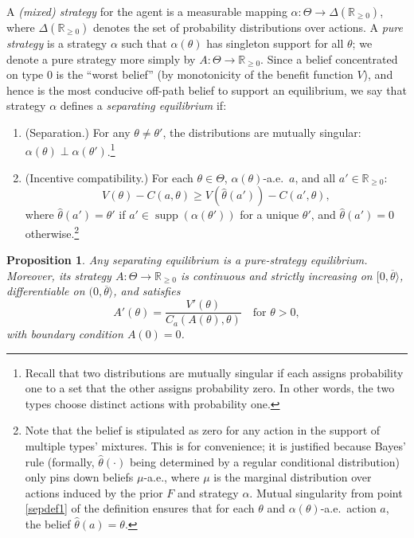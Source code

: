 \documentclass[12 pt]{article}
\newtheorem{proposition}{Proposition}
\theoremstyle{remark}
\theoremstyle{definition}
\newcommand{\R}{\mathbb{R}}
\newcommand{\Rpos}{\R_{\geq0}}
\DeclareMathOperator{\supp}{supp}
\def\typemin{0}
\def\typemax{\overline \theta}
\let\oldfootnote\footnote
\renewcommand\footnote[1]{\oldfootnote{\hspace{.5mm}#1}}
\begin{document}
A \emph{(mixed) strategy} for the agent is a measurable mapping $\alpha: \Theta \to \Delta(\Rpos)$, where $\Delta(\Rpos)$ denotes the set of probability distributions over actions. A \emph{pure strategy} is a strategy $\alpha$ such that $\alpha(\theta)$ has singleton support for all $\theta$; we denote a pure strategy more simply by $A:\Theta \to \Rpos$.
Since a belief concentrated on type $\typemin$ is the ``worst belief'' (by monotonicity of the benefit function $V$), and hence is the most conducive off-path belief to support an equilibrium, we say that strategy $\alpha$ defines a \emph{separating equilibrium} if:
\begin{enumerate}
    \item \label{sepdef1} (Separation.) For any $\theta \neq \theta'$, the distributions are mutually singular: $\alpha(\theta) \perp \alpha(\theta')$.\footnote{Recall that two distributions are {mutually singular} if each assigns probability one to a set that the other assigns probability zero. In other words, the two types choose distinct actions with probability one.}
    \item \label{sepdef2} (Incentive compatibility.) For each $\theta \in \Theta$, $\alpha(\theta)$-a.e.~$a$, and all $a' \in \Rpos$:
    \[
    V(\theta) - C(a, \theta) \geq V(\hat \theta(a')) - C(a', \theta),
    \]
    where $\hat \theta (a') = \theta'$ if $a' \in \supp(\alpha(\theta'))$ for a unique $\theta'$, and $\hat \theta (a') = 0$ otherwise.\footnote{Note that the belief is stipulated as zero for any action in the support of multiple types' mixtures. This is for convenience; it is justified because Bayes' rule (formally, $\hat \theta(\cdot)$ being determined by a regular conditional distribution) only pins down beliefs $\mu$-a.e., where $\mu$ is the marginal distribution over actions induced by the prior $F$ and strategy $\alpha$. Mutual singularity from point \ref{sepdef1} of the definition ensures that for each $\theta$ and $\alpha(\theta)$-a.e.~action $a$, the belief $\hat \theta(a)=\theta$.}    
\end{enumerate}

\begin{proposition}\label{prop:separating-differentiable}
Any separating equilibrium is a pure-strategy equilibrium. Moreover, its strategy $A: \Theta \to \Rpos$ is continuous and strictly increasing on $[\typemin,\typemax\rangle$, %
differentiable on $(\typemin, \typemax\rangle$, and satisfies
\begin{equation}
\label{e:ODE}
A'(\theta) = \frac{V'(\theta)}{C_a(A(\theta), \theta)} \quad \text{for } \theta > \typemin,
\end{equation}
with boundary condition $A(\typemin) = 0$.
\end{proposition}
\end{document}
